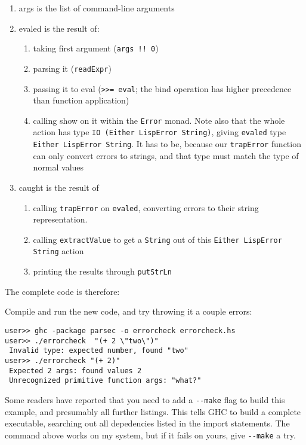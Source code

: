 \begin{enumerate}
	\item args is the list of command-line arguments
	\item evaled is the result of:
 	\begin{enumerate}
		\item taking first argument (\lstinline|args !! 0|)
		\item parsing it (\verb|readExpr|)
		\item passing it to eval (\lstinline|>>= eval|; the bind operation has higher precedence than function application)
		\item calling show on it within the \verb|Error| monad. Note also that the whole action has type \verb|IO (Either LispError String)|, giving \verb|evaled| type \verb|Either LispError String|. It has to be, because our \verb|trapError| function can only convert errors to strings, and that type must match the type of normal values
	\end{enumerate}
	\item caught is the result of
	\begin{enumerate}
		\item calling \verb|trapError| on \verb|evaled|, converting errors to their string representation.
		\item calling \verb|extractValue| to get a \verb|String| out of this \verb|Either LispError String| action
		\item printing the results through \verb|putStrLn|
	\end{enumerate}
\end{enumerate}
 
The complete code is therefore:
 
 
Compile and run the new code, and try throwing it a couple errors:
 
\begin{lstlisting}[language=shell,numbers=none,nolol]
user>> ghc -package parsec -o errorcheck errorcheck.hs
user>> ./errorcheck  "(+ 2 \"two\")"
 Invalid type: expected number, found "two"
user>> ./errorcheck "(+ 2)"
 Expected 2 args: found values 2
 Unrecognized primitive function args: "what?"
\end{lstlisting}
 
Some readers have reported that you need to add a \verb|--make| flag to build this example, and presumably all further listings. This tells GHC to build a complete executable, searching out all depedencies listed in the import statements. The command above works on my system, but if it fails on yours, give \verb|--make| a try.
